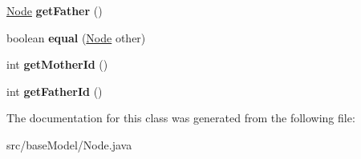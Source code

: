 \begin{DoxyCompactItemize}
\item 
\hypertarget{classbase_model_1_1_node_a0290d9705cb7cb874a29143de0b18f92}{}\hyperlink{classbase_model_1_1_node}{Node} {\bfseries get\+Father} ()\label{classbase_model_1_1_node_a0290d9705cb7cb874a29143de0b18f92}

\item 
\hypertarget{classbase_model_1_1_node_aeb37f6232549da717ee27c1f745b46c5}{}boolean {\bfseries equal} (\hyperlink{classbase_model_1_1_node}{Node} other)\label{classbase_model_1_1_node_aeb37f6232549da717ee27c1f745b46c5}

\item 
\hypertarget{classbase_model_1_1_node_a330e8fa7fbcc6e65d1c4342513bd91d1}{}int {\bfseries get\+Mother\+Id} ()\label{classbase_model_1_1_node_a330e8fa7fbcc6e65d1c4342513bd91d1}

\item 
\hypertarget{classbase_model_1_1_node_a9117fbad483caccdeb4274b99e67d4d0}{}int {\bfseries get\+Father\+Id} ()\label{classbase_model_1_1_node_a9117fbad483caccdeb4274b99e67d4d0}

\end{DoxyCompactItemize}


The documentation for this class was generated from the following file\+:\begin{DoxyCompactItemize}
\item 
src/base\+Model/Node.\+java\end{DoxyCompactItemize}
